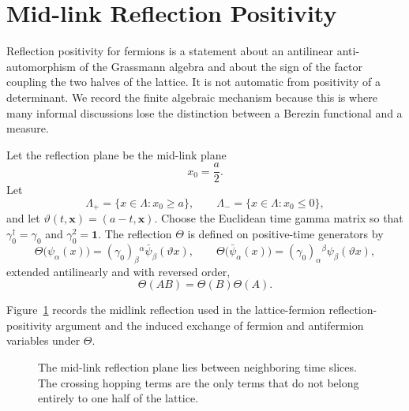 \section{Mid-link Reflection Positivity}

Reflection positivity for fermions is a statement about an antilinear
anti-automorphism of the Grassmann algebra and about the sign of the factor
coupling the two halves of the lattice.  It is not automatic from positivity
of a determinant.  We record the finite algebraic mechanism because this is
where many informal discussions lose the distinction between a Berezin
functional and a measure.

Let the reflection plane be the mid-link plane
\[
  x_0=\frac a2 .
\]
Let
\[
  \Lambda_+=\{x\in\Lambda:x_0\geq a\},
  \qquad
  \Lambda_-=\{x\in\Lambda:x_0\leq0\},
\]
and let \(\vartheta(t,\mathbf x)=(a-t,\mathbf x)\).  Choose the Euclidean
time gamma matrix so that \(\gamma_0^\dagger=\gamma_0\) and
\(\gamma_0^2=\mathbf 1\).  The reflection \(\Theta\) is defined on
positive-time generators by
\[
  \Theta\bigl(\psi_\alpha(x)\bigr)
  =
  (\gamma_0)_\beta{}^\alpha\bar\psi_\beta(\vartheta x),
  \qquad
  \Theta\bigl(\bar\psi_\alpha(x)\bigr)
  =
  (\gamma_0)_\alpha{}^\beta\psi_\beta(\vartheta x),
\]
extended antilinearly and with reversed order,
\[
  \Theta(AB)=\Theta(B)\Theta(A).
\]

Figure~\ref{fig:lattice-fermion-midlink-reflection} records the midlink
reflection used in the lattice-fermion reflection-positivity argument and the
induced exchange of fermion and antifermion variables under \(\Theta\).

\begin{figure}[H]
\centering
{}
\caption{The mid-link reflection plane lies between neighboring time slices.
The crossing hopping terms are the only terms that do not belong entirely to
one half of the lattice.}
\label{fig:lattice-fermion-midlink-reflection}
\end{figure}


